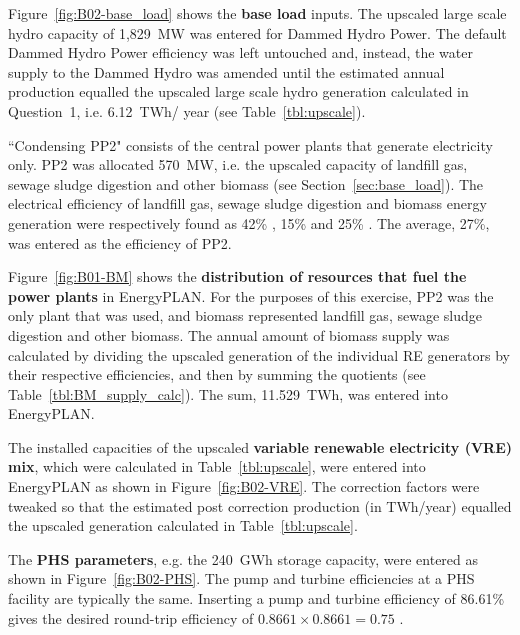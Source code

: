 Figure~\ref{fig:B02-base_load} shows the \textbf{base load} inputs.
The upscaled large scale hydro capacity of 1,829~MW was entered for Dammed Hydro Power.
The default Dammed Hydro Power efficiency was left untouched and, instead, the water supply to the Dammed Hydro was amended until the estimated annual production equalled the upscaled large scale hydro generation calculated in Question~1, i.e. 6.12~TWh/ year (see Table~\ref{tbl:upscale}).

``Condensing PP2" consists of the central power plants that generate electricity only.
PP2 was allocated 570~MW, i.e. the upscaled capacity of landfill gas, sewage sludge digestion and other biomass (see Section~\ref{sec:base_load}).
The electrical efficiency of landfill gas, sewage sludge digestion and biomass energy generation were respectively found as 42\% \citep{ClarkeEnergy}, 15\% \citep{Mills2015} and 25\% \citep{BERC2009}.
The average, 27\%, was entered as the efficiency of PP2.

Figure~\ref{fig:B01-BM} shows the \textbf{distribution of resources that fuel the power plants} in EnergyPLAN.
For the purposes of this exercise, PP2 was the only plant that was used, and biomass represented landfill gas, sewage sludge digestion and other biomass.
The annual amount of biomass supply was calculated by dividing the upscaled generation of the individual RE generators by their respective efficiencies, and then by summing the quotients (see Table~\ref{tbl:BM_supply_calc}).
The sum, 11.529~TWh, was entered into EnergyPLAN.



The installed capacities of the upscaled \textbf{variable renewable electricity (VRE) mix}, which were calculated in Table~\ref{tbl:upscale}, were entered into EnergyPLAN as shown in Figure~\ref{fig:B02-VRE}.
The correction factors were tweaked so that the estimated post correction production (in TWh/year) equalled the upscaled generation calculated in Table~\ref{tbl:upscale}.

The \textbf{PHS parameters}, e.g. the 240~GWh storage capacity, were entered as shown in Figure~\ref{fig:B02-PHS}.
The pump and turbine efficiencies at a PHS facility are typically the same.
Inserting a pump and turbine efficiency of 86.61\% gives the desired round-trip efficiency of $0.8661 \times 0.8661 = 0.75$ \citep{Connolly2015}.

